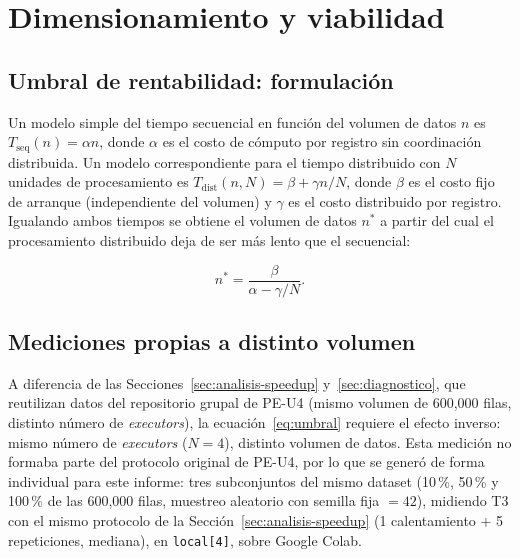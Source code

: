 \documentclass[11pt,a4paper]{article}
\begin{document}

    \section{Dimensionamiento y viabilidad}
    \label{sec:dimensionamiento}

    \subsection{Umbral de rentabilidad: formulación}

    Un modelo simple del tiempo secuencial en función del volumen de
    datos $n$ es $T_{\text{seq}}(n) = \alpha n$, donde $\alpha$ es el
    costo de cómputo por registro sin coordinación distribuida. Un modelo
    correspondiente para el tiempo distribuido con $N$ unidades de
    procesamiento es $T_{\text{dist}}(n, N) = \beta + \gamma n / N$, donde
    $\beta$ es el costo fijo de arranque (independiente del volumen) y
    $\gamma$ es el costo distribuido por registro. Igualando ambos
    tiempos se obtiene el volumen de datos $n^{*}$ a partir del cual el
    procesamiento distribuido deja de ser más lento que el secuencial:

    \begin{equation}
        n^{*} = \frac{\beta}{\alpha - \gamma/N}.
        \label{eq:umbral}
    \end{equation}

    \subsection{Mediciones propias a distinto volumen}

    A diferencia de las Secciones~\ref{sec:analisis-speedup}
    y~\ref{sec:diagnostico}, que reutilizan datos del repositorio grupal
    de PE-U4 (mismo volumen de 600{,}000 filas, distinto número de
    \emph{executors}), la ecuación~\eqref{eq:umbral} requiere el efecto
    inverso: mismo número de \emph{executors} ($N=4$), distinto volumen
    de datos. Esta medición no formaba parte del protocolo original de
    PE-U4, por lo que se generó de forma individual para este informe:
    tres subconjuntos del mismo dataset (10\,\%, 50\,\% y 100\,\% de las
    600{,}000 filas, muestreo aleatorio con semilla fija $=42$), midiendo
    T3 con el mismo protocolo de la Sección~\ref{sec:analisis-speedup}
    (1 calentamiento + 5 repeticiones, mediana), en \texttt{local[4]},
    sobre Google Colab.
\end{document}
